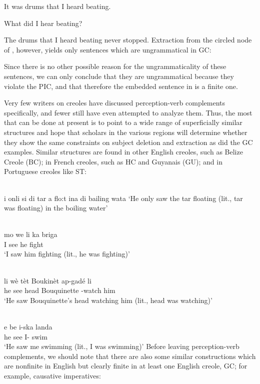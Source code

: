 \ea\label{ex:2:143}
 It was drums that I heard beating.
\z

\ea\label{ex:2:144}
 What did I hear beating?
\z

\ea\label{ex:2:145}
 The drums that I heard beating never stopped.
\z
Extraction from the circled node of , however, yields only sentences which are ungrammatical in GC:

\z

\z

\z
Since there is no other possible reason for the ungrammaticality of these sentences, we can only conclude that they are ungrammatical because they violate the PIC, and that therefore the embedded sentence in  is a finite one.


Very few writers on creoles have discussed perception-verb com\-plements specifically, and fewer still have even attempted to analyze them. Thus, the most that can be done at present is to point to a wide range of superficially similar structures and hope that scholars in the various regions will determine whether they show the same constraints on subject deletion and extraction as did the GC examples. Similar structures are found in other English creoles, such as Belize Creole (BC); in French creoles, such as HC and Guyanais (GU); and in Portuguese creoles like ST:

\ea\label{ex:2:149}
\\
i onli si di tar a flo:t ina di bailing wata
\glt `He only saw the tar floating (lit., tar was floating) in the boiling water'
\z

\ea\label{ex:2:150}
\\
 \gll mo we li ka briga\\
I see he {\ASP} fight\\
\glt `I saw him fighting (lit., he was fighting)'
\z

\ea\label{ex:2:151}
\\
\gll li wè tèt Boukinèt ap-gadé li\\
he see head Bouquinette \ASP-watch him \\
\glt `He saw Bouquinette's head watching him (lit., head was watching)'
\z

\ea\label{ex:2:152}
\\
\gll e be i-ska landa\\
he see {I-\ASP} swim\\
\glt `He saw me swimming (lit., I was swimming)'
\z
Before leaving perception-verb complements, we should note that there are also some similar constructions which are nonfinite in English but clearly finite in at least one English creole, GC; for example, causative imperatives:

